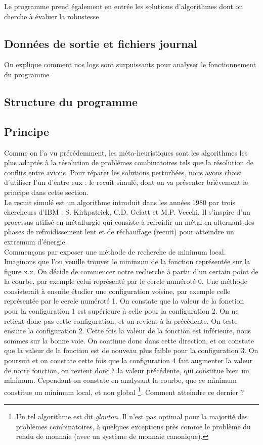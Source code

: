 Le programme prend également en entrée les solutions d'algorithmes dont on cherche à évaluer la robustesse

\subsection{Données de sortie et fichiers journal}

On explique comment nos logs sont surpuissants pour analyser le fonctionnement du programme

\subsection{Structure du programme}

\subsection{Principe }

Comme on l'a vu précédemment, les méta-heuristiques sont les algorithmes les plus adaptés à la résolution de problèmes combinatoires tels que la résolution de conflits entre avions. Pour réparer les solutions perturbées, nous avons choisi d'utiliser l'un d'entre eux : le recuit simulé, dont on va présenter brièvement le principe dans cette section.\\

Le recuit simulé est un algorithme introduit dans les années 1980 par trois chercheurs d'IBM : S. Kirkpatrick, C.D. Gelatt et M.P. Vecchi. Il s'inspire d'un processus utilisé en métallurgie qui consiste à refroidir un métal en alternant des phases de refroidissement lent et de réchauffage (recuit) pour atteindre un extremum d'énergie. \\ 

Commençons par exposer une méthode de recherche de minimum local. Imaginons que l'on veuille trouver le minimum de la fonction représentée sur la figure x.x. On décide de commencer notre recherche à partir d'un certain point de la courbe, par exemple celui représenté par le cercle numéroté 0. Une méthode consisterait à ensuite étudier une configuration voisine, par exemple celle représentée par le cercle numéroté 1. On constate que la valeur de la fonction pour la configuration 1 est supérieure à celle pour la configuration 2. On ne retient donc pas cette configuration, et on revient à la précédente. On teste ensuite la configuration 2. Cette fois la valeur de la fonction est inférieure, nous sommes sur la bonne voie. On continue donc dans cette direction, et on constate que la valeur de la fonction est de nouveau plus faible pour la configuration 3. On poursuit et on constate cette fois que la configuration 4 fait augmenter la valeur de notre fonction, on revient donc à la valeur précédente, qui constitue bien un minimum. Cependant on constate en analysant la courbe, que ce minimum constitue un minimum local, et non global \footnote{Un tel algorithme est dit \emph{glouton}. Il n'est pas optimal pour la majorité des problèmes combinatoires, à quelques exceptions près comme le problème du rendu de monnaie (avec un système de monnaie canonique).}. Comment atteindre ce dernier ?\\


